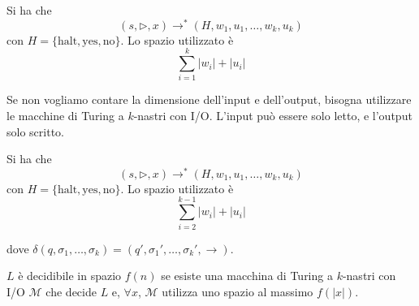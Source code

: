 \begin{definition}
    Si ha che
    $$
        (s,\rhd,x) \to^* (H,w_1,u_1,\dots,w_k,u_k)
    $$
    con $H=\{\text{halt},\text{yes},\text{no}\}$. Lo spazio utilizzato è
    $$
        \sum_{i=1}^k |w_i| + |u_i|
    $$
\end{definition}
Se non vogliamo contare la dimensione dell'input e dell'output, bisogna utilizzare le macchine di Turing a $k$-nastri con I/O. L'input può essere solo letto, e l'output solo scritto.

\begin{definition}
    Si ha che
    $$
        (s,\rhd,x) \to^* (H,w_1,u_1,\dots,w_k,u_k)
    $$
    con $H=\{\text{halt},\text{yes},\text{no}\}$. Lo spazio utilizzato è
    $$
        \sum_{i=2}^{k-1} |w_i| + |u_i|
    $$
\end{definition}
dove $\delta(q,\sigma_1,\dots,\sigma_k)=(q',\sigma_1',\dots,\sigma_k',\to)$.

\begin{definition}
    $L$ è decidibile in spazio $f(n)$ se esiste una macchina di Turing a $k$-nastri con I/O $\mathcal{M}$ che decide $L$ e, $\forall x$, $\mathcal{M}$ utilizza uno spazio al massimo $f(|x|)$.
\end{definition}

